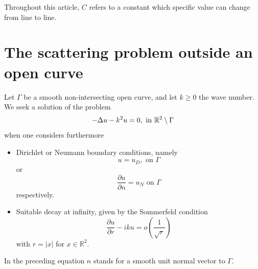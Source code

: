 \documentclass[a4paper]{article}
\begin{document}


Throughout this article, $C$ refers to a constant which specific value can change from line to line. 

\section{The scattering problem outside an open curve}

Let $\Gamma$ be a smooth non-intersecting open curve, and let $k \geq 0$ the wave number. We seek a solution of the problem
\begin{equation}
	-\Delta u - k^2 u = 0,  \text{ in } \mathbb{R}^2 \setminus \Gamma
	\label{Helmholtz}
\end{equation}
when one considers furthermore
\begin{itemize}
	\item Dirichlet or Neumann boundary conditions, namely
	\begin{equation}
	u = u_D, \text{ on } \Gamma
	\label{Dirichlet}
	\end{equation}
	or
	\begin{equation}
	\dfrac{\partial u}{\partial n} = u_N  \text{ on } \Gamma 
	\label{Neumann}
	\end{equation}
	respectively.
	\item Suitable decay at infinity, given by the Sommerfeld condition
	\begin{equation}
	\dfrac{\partial u}{\partial r} - iku = o\left(\frac{1}{\sqrt{r}}\right)
	\label{Sommerfeld}
	\end{equation}
	with $r=|x|$ for $x\in \mathbb{R}^2$.
\end{itemize}
In the preceding equation $n$ stands for a smooth unit normal vector to $\Gamma$.
\end{document}
